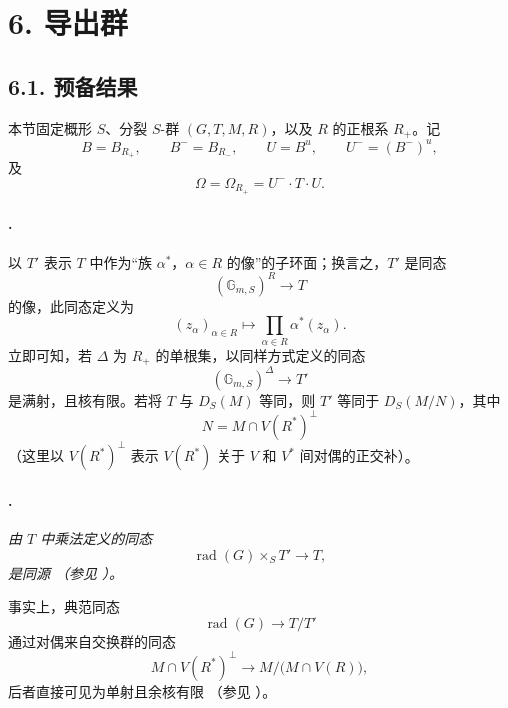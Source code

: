 \section*{6. 导出群}

\subsection*{6.1. 预备结果}

本节固定概形 \(S\)、分裂 \(S\)-群 \((G,T,M,R)\)，以及 \(R\) 的正根系 \(R_+\)。记
\[
  B=B_{R_+},\qquad B^-=B_{R_-},\qquad
  U=B^u,\qquad U^-=(B^-)^u,
\]
及
\[
  \Omega=\Omega_{R_+}=U^-\cdot T\cdot U.
\]

\paragraph{.}
以 \(T'\) 表示 \(T\) 中作为“族 \(\alpha^*\)，\(\alpha\in R\) 的像”的子环面；换言之，\(T'\) 是同态
\[
  (\mathbb G_{m,S})^R\longrightarrow T
\]
的像，此同态定义为
\[
  (z_\alpha)_{\alpha\in R}
  \longmapsto
  \prod_{\alpha\in R}\alpha^*(z_\alpha).
\]
立即可知，若 \(\Delta\) 为 \(R_+\) 的单根集，以同样方式定义的同态
\[
  (\mathbb G_{m,S})^\Delta\longrightarrow T'
\]
是满射，且核有限。若将 \(T\) 与 \(D_S(M)\) 等同，则 \(T'\) 等同于 \(D_S(M/N)\)，其中
\[
  N=M\cap V(R^*)^\perp
\]
\textup{（这里以 \(V(R^*)^\perp\) 表示 \(V(R^*)\) 关于 \(V\) 和 \(V^*\) 间对偶的正交补）}。

\paragraph{.}
{\itshape 由 \(T\) 中乘法定义的同态
\[
  \operatorname{rad}(G)\times_S T'\longrightarrow T,
\]
是同源 \textup{（参见 ）}。}

事实上，典范同态
\[
  \operatorname{rad}(G)\longrightarrow T/T'
\]
通过对偶来自交换群的同态
\[
  M\cap V(R^*)^\perp
  \longrightarrow
  M\big/\bigl(M\cap V(R)\bigr),
\]
后者直接可见为单射且余核有限 \textup{（参见 ）}。

